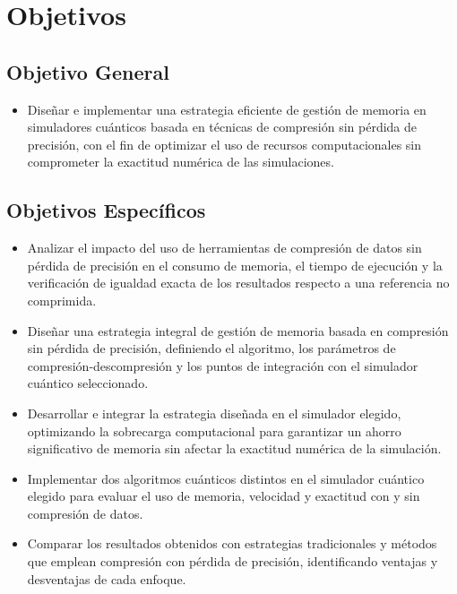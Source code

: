 \section{Objetivos}
\subsection{Objetivo General}
\begin{itemize}

    \item Diseñar e implementar una estrategia eficiente de gestión de memoria en simuladores cuánticos basada en técnicas de compresión sin pérdida de precisión, con el fin de optimizar el uso de recursos computacionales sin comprometer la exactitud numérica de las simulaciones.

\end{itemize}

\subsection{Objetivos Específicos}

\begin{itemize}
    \item Analizar el impacto del uso de herramientas de compresión de datos sin pérdida de precisión en el consumo de memoria, el tiempo de ejecución y la verificación de igualdad exacta de los resultados respecto a una referencia no comprimida.
    \item Diseñar una estrategia integral de gestión de memoria basada en compresión sin pérdida de precisión, definiendo el algoritmo, los parámetros de compresión‑descompresión y los puntos de integración con el simulador cuántico seleccionado.
    \item Desarrollar e integrar la estrategia diseñada en el simulador elegido, optimizando la sobrecarga computacional para garantizar un ahorro significativo de memoria sin afectar la exactitud numérica de la simulación.
    \item Implementar dos algoritmos cuánticos distintos en el simulador cuántico elegido para evaluar el uso de memoria, velocidad y exactitud con y sin compresión de datos.
    \item Comparar los resultados obtenidos con estrategias tradicionales y métodos que emplean compresión con pérdida de precisión, identificando ventajas y desventajas de cada enfoque.
\end{itemize}
